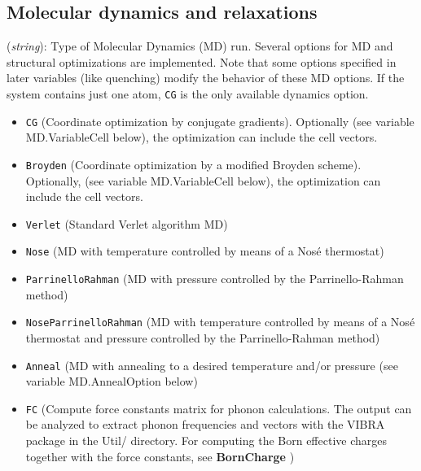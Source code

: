 \documentclass[11pt]{article}
\begin{document}
\vspace{5pt}
\subsection{Molecular dynamics and relaxations}

\begin{description}
\itemsep 10pt
\parsep 0pt

\item[{\bf MD.TypeOfRun}] ({\it string}): 
Type of Molecular Dynamics (MD)  run. 
Several options for MD and structural optimizations are 
implemented. Note that some options specified in later variables
(like quenching) modify the behavior of these MD options.
If the system contains just one atom, {\tt CG} is the only 
available dynamics option.
\begin{itemize}

\item {\tt CG} (Coordinate optimization by conjugate
  gradients). Optionally (see variable MD.VariableCell below), the
  optimization can include the cell vectors.

\item {\tt Broyden} (Coordinate optimization by a modified Broyden
  scheme). Optionally, (see variable MD.VariableCell below), the
  optimization can include the cell vectors.

\item {\tt Verlet} (Standard Verlet algorithm MD)

\item {\tt Nose}  (MD with temperature controlled  by means of a Nos\'e 
thermostat)

\item {\tt ParrinelloRahman}  (MD with pressure controlled by 
the Parrinello-Rahman method)

\item {\tt NoseParrinelloRahman}  (MD with temperature controlled
by means of a Nos\'e thermostat and pressure controlled by 
the Parrinello-Rahman method)

\item {\tt Anneal}  (MD with annealing to a desired
temperature and/or pressure (see variable MD.AnnealOption below)

\item {\tt FC}  (Compute force constants matrix for phonon
calculations. The output can be analyzed to extract phonon
frequencies and vectors with the VIBRA package in the Util/
directory. For computing the Born effective charges together with the
force constants, see {\bf BornCharge}
)


\end{itemize}
\end{description}
\end{document}
